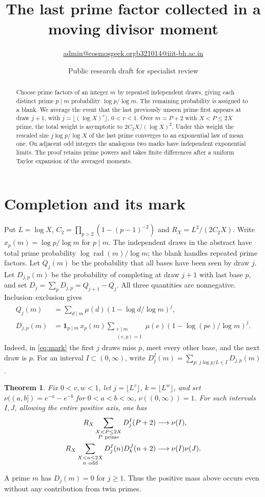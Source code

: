 \documentclass[11pt]{article}
\title{The last prime factor collected in a moving divisor moment}
\author{\small \href{mailto:admin@cosmosgeek.org}{admin@cosmosgeek.org}\qquad \href{mailto:b321014@iiit-bh.ac.in}{b321014@iiit-bh.ac.in}}
\date{Public research draft for specialist review}
\newtheorem{theorem}{Theorem}
\newcommand{\one}{\mathbf1}
\begin{document}
\maketitle
\begin{abstract}
Choose prime factors of an integer \(m\) by repeated independent draws, giving each distinct prime \(p\mid m\) probability \(\log p/\log m\). The remaining probability is assigned to a blank. We average the event that the last previously unseen prime first appears at draw \(j+1\), with \(j=\lfloor(\log X)^v\rfloor\), \(0<v<1\). Over \(m=P+2\) with \(X<P\le2X\) prime, the total weight is asymptotic to \(2C_2X/(\log X)^2\). Under this weight the rescaled size \(j\log p/\log X\) of the last prime converges to an exponential law of mean one. On adjacent odd integers the analogous two marks have independent exponential limits. The proof retains prime powers and takes finite differences after a uniform Taylor expansion of the averaged moments.
\end{abstract}

\section{Completion and its mark}
Put \(L=\log X\), \(C_2=\prod_{p>2}(1-(p-1)^{-2})\) and \(R_X=L^2/(2C_2X)\). Write \(x_p(m)=\log p/\log m\) for \(p\mid m\). The independent draws in the abstract have total prime probability \(\log\operatorname{rad}(m)/\log m\); the blank handles repeated prime factors. Let \(Q_j(m)\) be the probability that all bases have been seen by draw \(j\). Let \(D_{j,p}(m)\) be the probability of completing at draw \(j+1\) with last base \(p\), and set \(D_j=\sum_p D_{j,p}=Q_{j+1}-Q_j\). All three quantities are nonnegative. Inclusion--exclusion gives
\begin{align}
 Q_j(m)&=\sum_{d\mid m}\mu(d)(1-\log d/\log m)^j,\label{eq:Q}\\
 D_{j,p}(m)&=\one_{p\mid m}\, x_p(m)
 \sum_{\substack{e\mid m\\(e,p)=1}}\mu(e)
       (1-\log(pe)/\log m)^j.\label{eq:mark}
\end{align}
Indeed, in \eqref{eq:mark} the first \(j\) draws miss \(p\), meet every other base, and the next draw is \(p\). For an interval \(I\subset(0,\infty)\), write \(D_j^I(m)=\sum_{p:\,j\log p/L\in I}D_{j,p}(m)\).
\begin{theorem}
Fix \(0<v,w<1\), let \(j=\lfloor L^v\rfloor\), \(k=\lfloor L^w\rfloor\), and set \(\nu((a,b])=e^{-a}-e^{-b}\) for \(0<a<b<\infty\), \(\nu((0,\infty))=1\). For such intervals \(I,J\), allowing the entire positive axis, one has
\begin{align}
 R_X\sum_{\substack{X<P\le2X\\P\ {\rm prime}}}D_j^I(P+2)&\longrightarrow \nu(I),\\
 R_X\sum_{\substack{X<n\le2X\\n\ {\rm odd}}}D_j^I(n)D_k^J(n+2)&\longrightarrow \nu(I)\nu(J).
\end{align}
\end{theorem}
A prime \(m\) has \(D_j(m)=0\) for \(j\ge1\). Thus the positive mass above occurs even without any contribution from twin primes.
\end{document}
